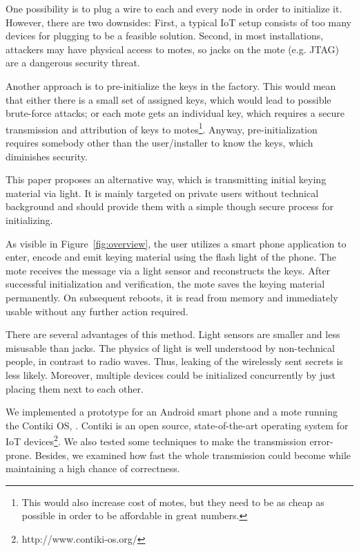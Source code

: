 \documentclass{sig-alternate} %
\begin{document}
One possibility is to plug a wire to each and every node in order to initialize it.
However, there are two downsides: First, a typical IoT setup consists of too many devices for plugging to be a feasible solution. Second, in most installations, attackers may have physical access to motes, so jacks on the mote (e.g. JTAG) are a dangerous security threat.

Another approach is to pre-initialize the keys in the factory.
This would mean that either there is a small set of assigned keys, which would lead to possible brute-force attacks; or each mote gets an individual key, which requires a secure transmission and attribution of keys to motes\footnote{This would also increase cost of motes, but they need to be as cheap as possible in order to be affordable in great numbers.}.
Anyway, pre-initialization requires somebody other than the user/installer to know the keys, which diminishes security.

This paper proposes an alternative way, which is transmitting initial keying material via light.
It is mainly targeted on private users without technical background and should provide them with a simple though secure process for initializing.

As visible in Figure~\ref{fig:overview}, the user utilizes a smart phone application to enter, encode and emit keying material using the flash light of the phone.
The mote receives the message via a light sensor and reconstructs the keys.
After successful initialization and verification, the mote saves the keying material permanently.
On subsequent reboots, it is read from memory and immediately usable without any further action required.

There are several advantages of this method.
Light sensors are smaller and less misusable than jacks.
The physics of light is well understood by non-technical people, in contrast to radio waves.
Thus, leaking of the wirelessly sent secrets is less likely.
Moreover, multiple devices could be initialized concurrently by just placing them next to each other.

We implemented a prototype for an Android smart phone and a mote running the Contiki OS, \cite{dunkels04contiki}.
Contiki is an open source, state-of-the-art operating system for IoT devices\footnote{http://www.contiki-os.org/}.
We also tested some techniques to make the transmission error-prone.
Besides, we examined how fast the whole transmission could become while maintaining a high chance of correctness.
\end{document}
